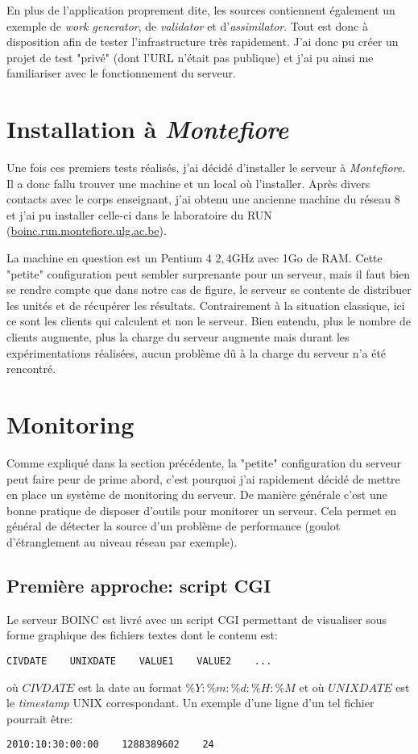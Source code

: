 \documentclass[a4paper, 12pt]{report}
\begin{document}
En plus de l'application proprement dite, les sources contiennent également un exemple de \textit{work generator}, de \textit{validator} et d'\textit{assimilator}. Tout est donc à disposition afin de tester l'infrastructure très rapidement. J'ai donc pu créer un projet de test "privé" (dont l'URL n'était pas publique) et j'ai pu ainsi me familiariser avec le fonctionnement du serveur.

\section{Installation à \textit{Montefiore}}
Une fois ces premiers tests réalisés, j'ai décidé d'installer le serveur à \textit{Montefiore}. Il a donc fallu trouver une machine et un local où l'installer. Après divers contacts avec le corps enseignant, j'ai obtenu une ancienne machine du réseau 8 et j'ai pu installer celle-ci dans le laboratoire du RUN (\url{boinc.run.montefiore.ulg.ac.be}).

La machine en question est un Pentium 4 \@ $2,4$GHz avec 1Go de RAM. Cette "petite" configuration peut sembler surprenante pour un serveur, mais il faut bien se rendre compte que dans notre cas de figure, le serveur se contente de distribuer les unités et de récupérer les résultats. Contrairement à la situation classique, ici ce sont les clients qui calculent et non le serveur. Bien entendu, plus le nombre de clients augmente, plus la charge du serveur augmente mais durant les expérimentations réalisées, aucun problème dû à la charge du serveur n'a été rencontré.

\section{Monitoring}
Comme expliqué dans la section précédente, la "petite" configuration du serveur peut faire peur de prime abord, c'est pourquoi j'ai rapidement décidé de mettre en place un système de monitoring du serveur. De manière générale c'est une bonne pratique de disposer d'outils pour monitorer un serveur. Cela permet en général de détecter la source d'un problème de performance (goulot d'étranglement au niveau réseau par exemple).

\subsection{Première approche: script CGI}
Le serveur \textsc{BOINC} est livré avec un script CGI permettant de visualiser sous forme graphique des fichiers textes dont le contenu est:
\begin{verbatim}
CIVDATE    UNIXDATE    VALUE1    VALUE2    ...
\end{verbatim}
où $CIVDATE$ est la date au format $\%Y:\%m:\%d:\%H:\%M$ et où $UNIXDATE$ est le \textit{timestamp} UNIX correspondant. Un exemple d'une ligne d'un tel fichier pourrait être:
\begin{verbatim}
2010:10:30:00:00    1288389602    24
\end{verbatim}
\end{document}
